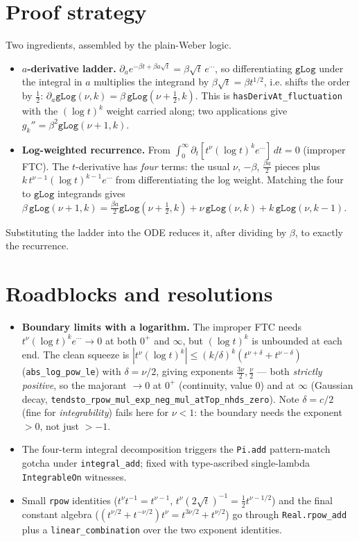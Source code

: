 \documentclass[11pt]{article}
\begin{document}
\section{Proof strategy}
Two ingredients, assembled by the plain-Weber logic.
\begin{itemize}
\item \textbf{$a$-derivative ladder.} $\partial_a e^{-\beta t+\beta a\sqrt t}=\beta\sqrt t\,e^{\cdots}$,
so differentiating $\texttt{gLog}$ under the integral in $a$ multiplies the integrand by $\beta\sqrt t=
\beta t^{1/2}$, i.e. shifts the order by $\tfrac12$: $\partial_a\texttt{gLog}(\nu,k)=\beta\,
\texttt{gLog}(\nu+\tfrac12,k)$. This is \texttt{hasDerivAt\_fluctuation} with the $(\log t)^k$ weight
carried along; two applications give $g_k''=\beta^2\texttt{gLog}(\nu+1,k)$.
\item \textbf{Log-weighted recurrence.} From $\int_0^\infty\partial_t[t^\nu(\log t)^k e^{\cdots}]\,dt=0$
(improper FTC). The $t$-derivative has \emph{four} terms: the usual $\nu$, $-\beta$, $\tfrac{\beta a}2$
pieces plus $k\,t^{\nu-1}(\log t)^{k-1}e^{\cdots}$ from differentiating the log weight. Matching the four
to $\texttt{gLog}$ integrands gives $\beta\,\texttt{gLog}(\nu+1,k)=\tfrac{\beta a}2\texttt{gLog}
(\nu+\tfrac12,k)+\nu\,\texttt{gLog}(\nu,k)+k\,\texttt{gLog}(\nu,k-1)$.
\end{itemize}
Substituting the ladder into the ODE reduces it, after dividing by $\beta$, to exactly the recurrence.

\section{Roadblocks and resolutions}
\begin{itemize}
\item \textbf{Boundary limits with a logarithm.} The improper FTC needs $t^\nu(\log t)^k e^{\cdots}\to0$
at both $0^+$ and $\infty$, but $(\log t)^k$ is unbounded at each end. The clean squeeze is
$|t^\nu(\log t)^k|\le(k/\delta)^k(t^{\nu+\delta}+t^{\nu-\delta})$ (\texttt{abs\_log\_pow\_le}) with
$\delta=\nu/2$, giving exponents $\tfrac{3\nu}2,\tfrac\nu2$ --- both \emph{strictly positive}, so the
majorant $\to0$ at $0^+$ (continuity, value $0$) and at $\infty$ (Gaussian decay,
\texttt{tendsto\_rpow\_mul\_exp\_neg\_mul\_atTop\_nhds\_zero}). Note $\delta=c/2$ (fine for
\emph{integrability}) fails here for $\nu<1$: the boundary needs the exponent $>0$, not just $>-1$.
\item The four-term integral decomposition triggers the \texttt{Pi.add} pattern-match gotcha under
\texttt{integral\_add}; fixed with type-ascribed single-lambda \texttt{IntegrableOn} witnesses.
\item Small \texttt{rpow} identities ($t^\nu t^{-1}=t^{\nu-1}$, $t^\nu(2\sqrt t)^{-1}=\tfrac12
t^{\nu-1/2}$) and the final constant algebra ($(t^{\nu/2}+t^{-\nu/2})t^\nu=t^{3\nu/2}+t^{\nu/2}$) go
through \texttt{Real.rpow\_add} plus a \texttt{linear\_combination} over the two exponent identities.
\end{itemize}
\end{document}
